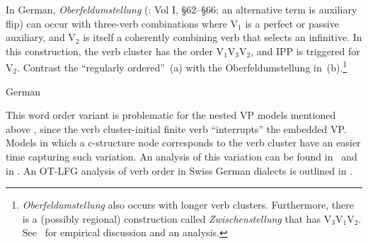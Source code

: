 \documentclass[output=paper,hidelinks]{langscibook}
\begin{document}
In German, \textit{Oberfeldumstellung} (\citealt{bech:1955}: Vol I, §62–§66; an alternative term is auxiliary flip) can occur with three-verb combinations where V$_1$ is a
perfect or passive auxiliary, and V$_2$ is itself a coherently
combining verb that selects an infinitive. In this construction, the
verb cluster has the order V$_1$V$_3$V$_2$, and IPP is triggered for
V$_2$. Contrast the ``regularly ordered''~(a) with the
Oberfeldumstellung in~(b).\footnote{\textit{Oberfeldumstellung} also occurs with longer
verb clusters. Furthermore, there is a (possibly regional)
construction called \textit{Zwischenstellung} that has
V$_3$V$_1$V$_2$. See~\citet{cook:2001:revdiss} for empirical
discussion and an analysis.}

\begin{exe}
  \ex German \citep[§1.4, example 1.31]{cook:2001:revdiss}
  \begin{xlist}
  \end{xlist}
\end{exe}
%
This word order variant is problematic for the nested VP models
mentioned above \citep[namely,][]{netter:1988,Choi1999}, since the verb
cluster-initial finite verb ``interrupts'' the embedded VP. Models in which a
c-structure node corresponds to the verb cluster
\citep[namely,][]{ZaenenKaplan2002:Subsumption,Berman2003,clement-etal:2002:lfg}
have an easier time capturing such variation. An analysis of this
variation can be found in~\citet[in terms of
  c-structure]{clement-etal:2002:lfg} and in \citet[in terms of the
  interaction between syntax and information
  structure]{cook:2001:revdiss}. An OT-LFG analysis of verb order in
Swiss German dialects is outlined in \citet{seiler:2007}.
\end{document}
